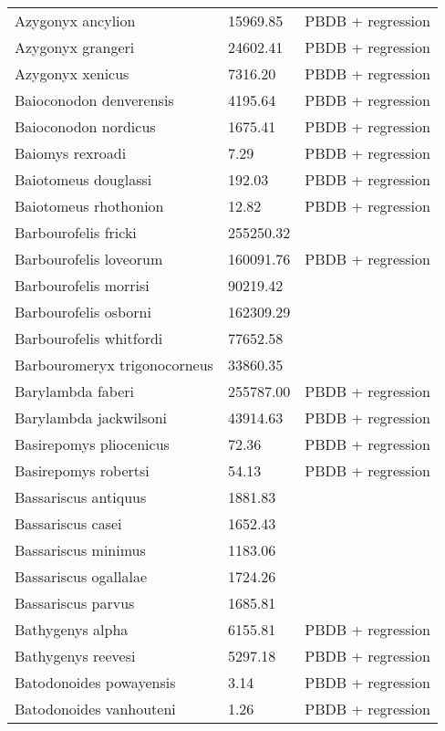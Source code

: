 \begin{center}
\begin{longtable}{p{} p{} p{} }
  Azygonyx ancylion & 15969.85 & PBDB + regression \\ 
  Azygonyx grangeri & 24602.41 & PBDB + regression \\ 
  Azygonyx xenicus & 7316.20 & PBDB + regression \\ 
  Baioconodon denverensis & 4195.64 & PBDB + regression \\ 
  Baioconodon nordicus & 1675.41 & PBDB + regression \\ 
  Baiomys rexroadi & 7.29 & PBDB + regression \\ 
  Baiotomeus douglassi & 192.03 & PBDB + regression \\ 
  Baiotomeus rhothonion & 12.82 & PBDB + regression \\ 
  Barbourofelis fricki & 255250.32 & \cite{Tomiya2013} \\ 
  Barbourofelis loveorum & 160091.76 & PBDB + regression \\ 
  Barbourofelis morrisi & 90219.42 & \cite{Tomiya2013} \\ 
  Barbourofelis osborni & 162309.29 & \cite{Martin2002a} \\ 
  Barbourofelis whitfordi & 77652.58 & \cite{Tomiya2013} \\ 
  Barbouromeryx trigonocorneus & 33860.35 & \cite{Tomiya2013} \\ 
  Barylambda faberi & 255787.00 & PBDB + regression \\ 
  Barylambda jackwilsoni & 43914.63 & PBDB + regression \\ 
  Basirepomys pliocenicus & 72.36 & PBDB + regression \\ 
  Basirepomys robertsi & 54.13 & PBDB + regression \\ 
  Bassariscus antiquus & 1881.83 & \cite{Tomiya2013} \\ 
  Bassariscus casei & 1652.43 & \cite{Tomiya2013} \\ 
  Bassariscus minimus & 1183.06 & \cite{Robinson1966} \\ 
  Bassariscus ogallalae & 1724.26 & \cite{Gidley1920} \\ 
  Bassariscus parvus & 1685.81 & \cite{Tomiya2013} \\ 
  Bathygenys alpha & 6155.81 & PBDB + regression \\ 
  Bathygenys reevesi & 5297.18 & PBDB + regression \\ 
  Batodonoides powayensis & 3.14 & PBDB + regression \\ 
  Batodonoides vanhouteni & 1.26 & PBDB + regression \\ 

\end{longtable}
\end{center}
